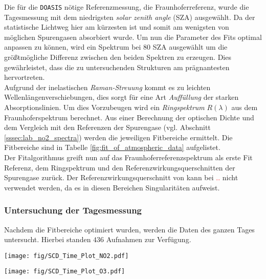 \documentclass[12pt, a4paper, bibliography=totoc]{scrartcl}
\begin{document}
\begin{multicols}{2}
Die für die \verb*+DOASIS+ nötige Referenzmessung, die Fraunhoferreferenz, wurde die Tagesmessung mit dem niedrigsten
\textit{solar zenith angle} (SZA) ausgewählt. 
Da der statistische Lichtweg hier am kürzesten ist und somit am wenigsten von möglichen Spurengasen absorbiert wurde.
Um nun die Parameter des Fits optimal anpassen zu können, wird ein Spektrum bei $80$ SZA ausgewählt um die größtmögliche Differenz zwischen den beiden Spektren zu erzeugen. 
Dies gewährleistet, dass die zu untersuchenden Strukturen am prägnantesten hervortreten. \\
Aufgrund der inelastischen \textit{Raman-Streuung} kommt es zu leichten Wellenlängenverschiebungen, dies sorgt für eine Art \textit{Auffüllung} der starken Absorptionslinien.
Um dies Vorzubeugen wird ein \textit{Ringspektrum} $R(\lambda)$ aus dem Fraunhoferspektrum berechnet.
Aus einer Berechnung der optischen Dichte und dem Vergleich mit den Referenzen der Spurengase (vgl. Abschnitt \ref{sssec:lab_no2_spectra}) werden die jeweiligen Fitbereiche ermittelt. 
Die Fitbereiche sind in Tabelle \ref{fig:fit_of_atmospheric_data} aufgelistet.\\
Der Fitalgorithmus greift nun auf das Fraunhoferreferenzspektrum als erste Fit Referenz, dem Ringspektrum und den Referenzwirkungsquerschnitten der Spurengase zurück. 
Der Referenzwirkungsquerschnitt von  kann bei \textcolor{red}{ ..} nicht verwendet werden, da es in diesen Bereichen Singularitäten aufweist.

\subsubsection{Untersuchung der Tagesmessung}\label{sssec:tagesmessung}

Nachdem die Fitbereiche optimiert wurden, werden die Daten des ganzen Tages untersucht. 
Hierbei standen $436$ Aufnahmen zur Verfügung.


\begin{center}
	\texttt{[image: fig/SCD\_Time\_Plot\_NO2.pdf]}
	\label{fig:delta_SCD_time_NO2}
\end{center}
       
\begin{center}
	\texttt{[image: fig/SCD\_Time\_Plot\_O3.pdf]}
	\label{fig:delta_SCD_time_O3}
\end{center}       


\end{multicols}
\end{document}
